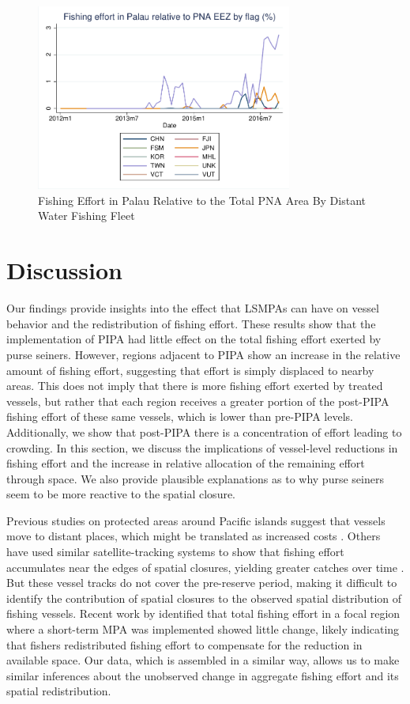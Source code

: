 \documentclass[9pttwoside,lineno]{pnas-new}
\begin{document}
\begin{figure}[h]
	\includegraphics[width=0.75\textwidth]{img/By_flag_Fishing_effort_Palau_relative_PNA}
	\caption{Fishing Effort in Palau Relative to the Total PNA Area By Distant Water Fishing Fleet}
\end{figure}


\clearpage


\section{Discussion}\label{discussion}

Our findings provide insights into the effect that LSMPAs
can have on vessel behavior and the redistribution of fishing effort.
These results show that the implementation of PIPA had
little effect on the total fishing effort exerted by purse seiners. However, regions
adjacent to PIPA show an increase in the relative amount of fishing
effort, suggesting that effort is simply displaced to nearby areas.
This does not imply that there is more fishing effort exerted by treated
vessels, but rather that each region receives a greater portion of the
post-PIPA fishing effort of these same vessels, which is lower than
pre-PIPA levels. Additionally, we show that post-PIPA there is a
concentration of effort leading to crowding. In this section, we discuss
the implications of vessel-level reductions in fishing effort and the
increase in relative allocation of the remaining effort through space.
We also provide plausible explanations as to why purse seiners seem to
be more reactive to the spatial closure.

Previous studies on protected areas around Pacific islands suggest that vessels move to
distant places, which might be translated as increased costs
\citep{stevenson_2013}. Others have used similar satellite-tracking systems to
show that fishing effort accumulates near the edges of spatial closures,
yielding greater catches over time \citep{murawski_2005}. But these vessel tracks
do not cover the pre-reserve period, making it difficult to identify the
contribution of spatial closures to the observed spatial distribution of
fishing vessels. Recent work by \citet{elahi_2018} identified that total
fishing effort in a focal region where a short-term MPA was implemented
showed little change, likely indicating that fishers redistributed
fishing effort to compensate for the reduction in available space. Our
data, which is assembled in a similar way, allows us to make similar
inferences about the unobserved change in aggregate fishing effort and
its spatial redistribution.
\end{document}
